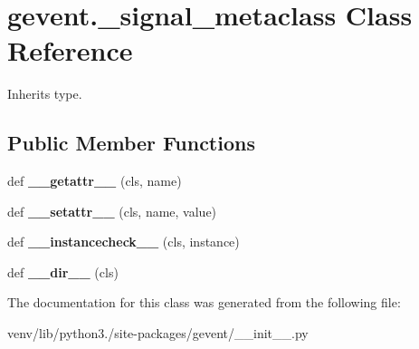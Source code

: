 \hypertarget{classgevent_1_1__signal__metaclass}{}\section{gevent.\+\_\+signal\+\_\+metaclass Class Reference}
\label{classgevent_1_1__signal__metaclass}


Inherits type.

\subsection*{Public Member Functions}
\begin{DoxyCompactItemize}
\item 
\mbox{\label{classgevent_1_1__signal__metaclass_a600a8b378619aee3969d47df14bbdeaa}} 
def {\bfseries \+\_\+\+\_\+getattr\+\_\+\+\_\+} (cls, name)
\item 
\mbox{\label{classgevent_1_1__signal__metaclass_af12a40ba2dd8eb04b82812cf5f7a69fc}} 
def {\bfseries \+\_\+\+\_\+setattr\+\_\+\+\_\+} (cls, name, value)
\item 
\mbox{\label{classgevent_1_1__signal__metaclass_a1fc8a932f792b75b0c57c5cc48da7997}} 
def {\bfseries \+\_\+\+\_\+instancecheck\+\_\+\+\_\+} (cls, instance)
\item 
\mbox{\label{classgevent_1_1__signal__metaclass_ab0d9d00903cb5f59d387e36e4d35dea9}} 
def {\bfseries \+\_\+\+\_\+dir\+\_\+\+\_\+} (cls)
\end{DoxyCompactItemize}


The documentation for this class was generated from the following file\+:\begin{DoxyCompactItemize}
\item 
venv/lib/python3./site-\/packages/gevent/\+\_\+\+\_\+init\+\_\+\+\_\+.\+py\end{DoxyCompactItemize}
